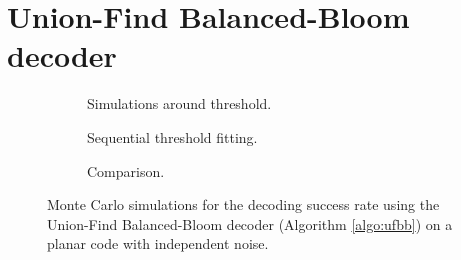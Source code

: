 \section{Union-Find Balanced-Bloom decoder}\label{ap:figufbb}


\begin{figure}[htbp]
  \centering
  \begin{subfigure}[b]{0.49\textwidth}
    \begin{adjustbox}{Clip=0 1em 0 0}
      
    \end{adjustbox}
    \caption{Simulations around threshold.}
  \end{subfigure}
  \begin{subfigure}[b]{0.49\textwidth}
    \begin{adjustbox}{Clip=0 1em 0 0}
      
    \end{adjustbox}
    \caption{Sequential threshold fitting.}
  \end{subfigure}
  \begin{subfigure}[b]{\textwidth}
    \begin{adjustbox}{Clip=0 1em 0 0}
    
    \end{adjustbox}
    \caption{Comparison.}
  \end{subfigure}
  \caption{Monte Carlo simulations for the decoding success rate using the Union-Find Balanced-Bloom decoder (Algorithm \ref{algo:ufbb}) on a planar code with independent noise.}
  \label{fig:thres_ufbb_planar_2d}
\end{figure}


